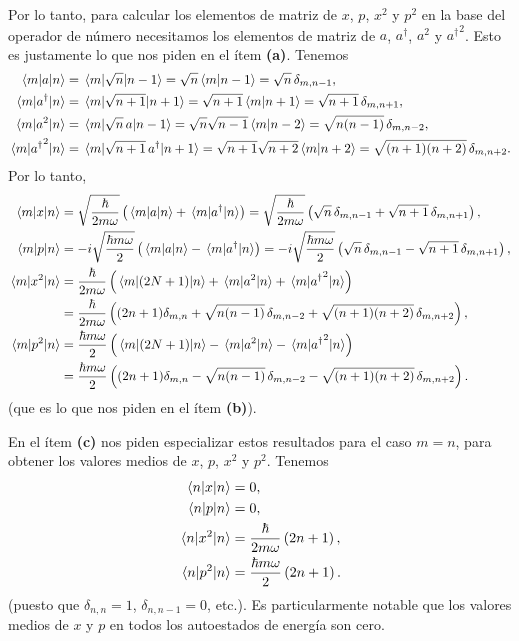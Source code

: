 \documentclass[10pt, a4paper]{article}
\newcommand{\xprefactsq}{\frac{\hbar}{2m\omega}}
\newcommand{\xprefact}{\sqrt{\xprefactsq}}
\newcommand{\pprefactsq}{\frac{\hbar m \omega}{2}}
\newcommand{\pprefact}{\sqrt{\pprefactsq}}
\newcommand{\N}{N}
\numberwithin{equation}{subsection}
\begin{document}
Por lo tanto, para calcular los elementos de matriz de $x$, $p$, $x^2$ y $p^2$
en la base del operador de número necesitamos los elementos de matriz de $a$,
$a^\dagger$, $a^2$ y ${a^\dagger}^2$. Esto es justamente lo que nos piden en el
ítem \textbf{(a)}. Tenemos
\begin{align}
  \matrixel{m}{a}{n} &= \matrixel{m}{\sqrt{n}}{n-1} = \sqrt{n}\braket{m}{n-1} =
    \sqrt{n}\,\delta_{m,n-1}, \\
  \matrixel{m}{a^\dagger}{n} &= \matrixel{m}{\sqrt{n+1}}{n+1} =
    \sqrt{n+1}\braket{m}{n+1} = \sqrt{n+1}\,\delta_{m,n+1}, \\
  \matrixel{m}{a^2}{n} &= \matrixel{m}{\sqrt{n}\,a}{n-1} =
    \sqrt{n}\sqrt{n-1}\braket{m}{n-2} = \sqrt{n(n-1)}\,\delta_{m,n-2}, \\
  \matrixel{m}{{a^\dagger}^2}{n} &= \matrixel{m}{\sqrt{n+1}\,a^\dagger}{n+1} =
    \sqrt{n+1}\sqrt{n+2}\braket{m}{n+2} = \sqrt{(n+1)(n+2)}\,\delta_{m,n+2}.
\end{align}
Por lo tanto,
\begin{align}
  \matrixel{m}{x}{n} &= \xprefact\left(\matrixel{m}{a}{n} +
    \matrixel{m}{a^\dagger}{n}\right) = \xprefact\left(\sqrt{n}\,\delta_{m,n-1}
    + \sqrt{n+1}\,\delta_{m,n+1}\right), \\
  \matrixel{m}{p}{n} &= -i\pprefact\left(\matrixel{m}{a}{n} -
    \matrixel{m}{a^\dagger}{n}\right) = -i\pprefact\left(
    \sqrt{n}\,\delta_{m,n-1} - \sqrt{n+1}\,\delta_{m,n+1}\right), \\
  \matrixel{m}{x^2}{n} &= \xprefactsq\left(\matrixel{m}{(2\N + 1)}{n} +
    \matrixel{m}{a^2}{n} + \matrixel{m}{{a^\dagger}^2}{n}\right) \nonumber \\
  &= \xprefactsq\left((2n + 1)\delta_{m,n} + \sqrt{n(n-1)}\,\delta_{m,n-2} +
    \sqrt{(n+1)(n+2)}\,\delta_{m,n+2}\right), \\
  \matrixel{m}{p^2}{n} &= \pprefactsq\left(\matrixel{m}{(2\N + 1)}{n} -
    \matrixel{m}{a^2}{n} - \matrixel{m}{{a^\dagger}^2}{n}\right) \nonumber \\
  &= \pprefactsq\left((2n + 1)\delta_{m,n} - \sqrt{n(n-1)}\,\delta_{m,n-2} -
    \sqrt{(n+1)(n+2)}\,\delta_{m,n+2}\right).
\end{align}
(que es lo que nos piden en el ítem \textbf{(b)}).

\bigbreak

En el ítem \textbf{(c)} nos piden especializar estos resultados para el caso $m
= n$, para obtener los valores medios de $x$, $p$, $x^2$ y $p^2$. Tenemos
\begin{align}
  \expval{x}{n} &= 0, \\
  \expval{p}{n} &= 0, \\
  \expval{x^2}{n} &= \xprefactsq\left(2n + 1\right), \\
  \expval{p^2}{n} &= \pprefactsq\left(2n + 1\right).
\end{align}
(puesto que $\delta_{n,n} = 1$, $\delta_{n,n-1} = 0$, etc.).
Es particularmente notable que los valores medios de $x$ y $p$ en todos los
autoestados de energía son cero.
\end{document}
